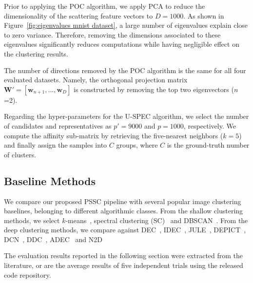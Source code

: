 \documentclass[11pt]{article}
\theoremstyle{definition}
\newcommand{\Eigenvectors}{\mathbf{W}}
\newcommand{\Eigenvector}[1]{\mathbf{w}_{#1}}
\newcommand{\Candidates}{p'}
\newcommand{\Representatives}{p}
\newcommand{\NumClusters}{C}
\newcommand{\Figure}[1]{Figure~\ref{#1}}
\begin{document}
Prior to applying the POC algorithm, we apply PCA to reduce the dimensionality of the scattering feature vectors to $D=1000$. As shown in \Figure{fig:eigenvalues mnist dataset}, a large number of eigenvalues explain close to zero variance. Therefore, removing the dimensions associated to these eigenvalues significantly reduces computations while having negligible effect on the clustering results.

The number of directions removed by the POC algorithm is the same for all four evaluated datasets.
Namely, the orthogonal projection matrix $\Eigenvectors' = [\Eigenvector{n+1}, ..., \Eigenvector{D}]$ is constructed by removing the top two eigenvectors ($n$=2).

Regarding the hyper-parameters for the U-SPEC algorithm, we select the number of candidates and representatives as $\Candidates= 9000$ and $\Representatives=1000$, respectively. We compute the affinity sub-matrix by retrieving the five-nearest neighbors ($k = 5$) and finally assign the samples into $\NumClusters$ groups, where $\NumClusters$ is the ground-truth number of clusters.


\subsection{Baseline Methods}\label{section: baseline methods}

We compare our proposed PSSC pipeline with several popular image clustering baselines, belonging to different algorithmic classes. From the shallow clustering methods, we select $k$-means~\cite{Macqueen_KMeansClustering_1967}, spectral clustering (SC)~\cite{Ng_SpectralClustering_2002} and DBSCAN~\cite{Ester_DBSCANDensityBasedClustering_1996}. From the deep clustering methods, we compare against DEC~\cite{Xie_UnsupervisedDeepEmbeddingClustering_2016}, IDEC~\cite{Guo_ImprovedDeepEmbeddedClustering_2017}, JULE~\cite{Yang_JointUnsupervisedLearningImageClusters_2016joint}, 
DEPICT~\cite{Ghasedi_DEPICTDeepClusteringJointConvolutionalAutoencoderAndRelativeEntropyMinimization_2017},
DCN~\cite{Yang_TowrdsKMeansFriendlySpacesDeepClustering_2017},
DDC~\cite{Ren_DeepDensityBasedClustering_2020}, ADEC~\cite{Mrabah_AdversarialDeepEmbeddedClustering_2020} and 
N2D~\cite{Mcconville_DeepClusteringManifoldAutoencodedEmbedding_2019}


The evaluation results reported in the following section were extracted from the literature, or are the average results of five independent trials using the released code repository.
\end{document}

